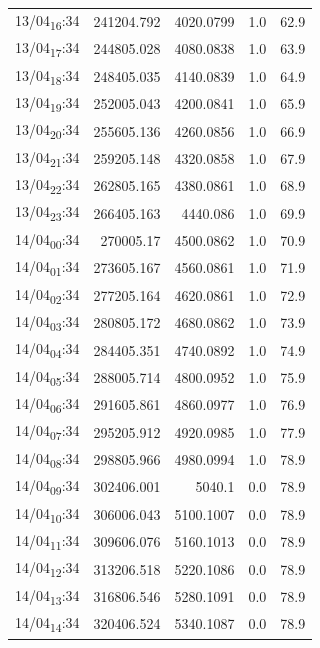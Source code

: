 \documentclass[11pt]{article}
\begin{document}
\begin{center}
\begin{tabular}{lrrrr}
13/04\textsubscript{16}:34 & 241204.792 & 4020.0799 & 1.0 & 62.9\\[0pt]
13/04\textsubscript{17}:34 & 244805.028 & 4080.0838 & 1.0 & 63.9\\[0pt]
13/04\textsubscript{18}:34 & 248405.035 & 4140.0839 & 1.0 & 64.9\\[0pt]
13/04\textsubscript{19}:34 & 252005.043 & 4200.0841 & 1.0 & 65.9\\[0pt]
13/04\textsubscript{20}:34 & 255605.136 & 4260.0856 & 1.0 & 66.9\\[0pt]
13/04\textsubscript{21}:34 & 259205.148 & 4320.0858 & 1.0 & 67.9\\[0pt]
13/04\textsubscript{22}:34 & 262805.165 & 4380.0861 & 1.0 & 68.9\\[0pt]
13/04\textsubscript{23}:34 & 266405.163 & 4440.086 & 1.0 & 69.9\\[0pt]
14/04\textsubscript{00}:34 & 270005.17 & 4500.0862 & 1.0 & 70.9\\[0pt]
14/04\textsubscript{01}:34 & 273605.167 & 4560.0861 & 1.0 & 71.9\\[0pt]
14/04\textsubscript{02}:34 & 277205.164 & 4620.0861 & 1.0 & 72.9\\[0pt]
14/04\textsubscript{03}:34 & 280805.172 & 4680.0862 & 1.0 & 73.9\\[0pt]
14/04\textsubscript{04}:34 & 284405.351 & 4740.0892 & 1.0 & 74.9\\[0pt]
14/04\textsubscript{05}:34 & 288005.714 & 4800.0952 & 1.0 & 75.9\\[0pt]
14/04\textsubscript{06}:34 & 291605.861 & 4860.0977 & 1.0 & 76.9\\[0pt]
14/04\textsubscript{07}:34 & 295205.912 & 4920.0985 & 1.0 & 77.9\\[0pt]
14/04\textsubscript{08}:34 & 298805.966 & 4980.0994 & 1.0 & 78.9\\[0pt]
14/04\textsubscript{09}:34 & 302406.001 & 5040.1 & 0.0 & 78.9\\[0pt]
14/04\textsubscript{10}:34 & 306006.043 & 5100.1007 & 0.0 & 78.9\\[0pt]
14/04\textsubscript{11}:34 & 309606.076 & 5160.1013 & 0.0 & 78.9\\[0pt]
14/04\textsubscript{12}:34 & 313206.518 & 5220.1086 & 0.0 & 78.9\\[0pt]
14/04\textsubscript{13}:34 & 316806.546 & 5280.1091 & 0.0 & 78.9\\[0pt]
14/04\textsubscript{14}:34 & 320406.524 & 5340.1087 & 0.0 & 78.9\\[0pt]
\end{tabular}
\end{center}
\end{document}
